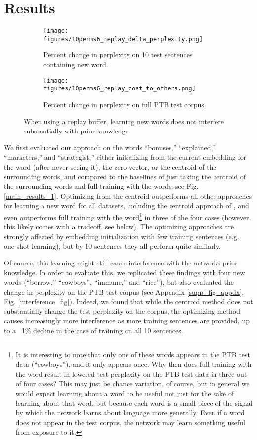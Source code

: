 \documentclass{article}
\begin{document}
\section{Results}
\begin{figure}
\centering
\begin{subfigure}[b]{\textwidth}
\texttt{[image: figures/10perms6\_replay\_delta\_perplexity.png]}
\caption{Percent change in perplexity on 10 test sentences containing new word.}
\end{subfigure}
\begin{subfigure}[b]{\textwidth}
\texttt{[image: figures/10perms6\_replay\_cost\_to\_others.png]}
\caption{Percent change in perplexity on full PTB test corpus.}
\end{subfigure}
\caption{When using a replay buffer, learning new words does not interfere substantially with prior knowledge.}
\label{ameliorating_interference_fig}
\end{figure}
We first evaluated our approach on the words ``bonuses,'' ``explained,'' ``marketers,'' and ``strategist,'' either initializing from the current embedding for the word (after never seeing it), the zero vector, or the centroid of the surrounding words, and compared to the baselines of just taking the centroid of the surrounding words and full training with the words, see Fig. \ref{main_results_1}. Optimizing from the centroid outperforms all other approaches for learning a new word for all datasets, including the centroid approach of \citet{Lazaridou2017}, and even outperforms full training with the word\footnote{It is interesting to note that only one of these words appears in the PTB test data (``cowboys''), and it only appears once. Why then does full training with the word result in lowered test perplexity on the PTB test data in three out of four cases? This may just be chance variation, of course, but in general we would expect learning about a word to be useful not just for the sake of learning about that word, but because each word is a small piece of the signal by which the network learns about language more generally. Even if a word does not appear in the test corpus, the network may learn something useful from exposure to it.} in three of the four cases (however, this likely comes with a tradeoff, see below). The optimizing approaches are strongly affected by embedding initialization with few training sentences (e.g. one-shot learning), but by 10 sentences they all perform quite similarly. \par
Of course, this learning might still cause interference with the networks prior knowledge. In order to evaluate this, we replicated these findings with four new words (``borrow,'' ``cowboys'', ``immune,'' and ``rice''), but also evaluated the change in perplexity on the PTB test corpus (see Appendix \ref{supp_fig_appdx}, Fig. \ref{interference_fig}). Indeed, we found that while the centroid method does not substantially change the test perplexity on the corpus, the optimizing method causes increasingly more interference as more training sentences are provided, up to a ~1\% decline in the case of training on all 10 sentences. \par
\end{document}
